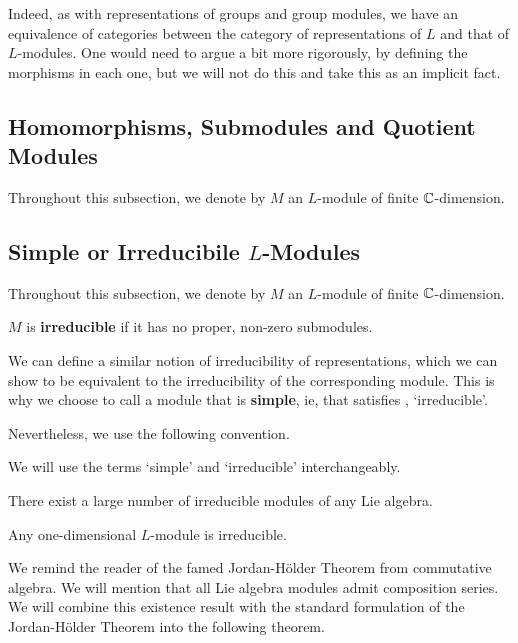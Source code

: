 Indeed, as with representations of groups and group modules, we have an equivalence of categories between the category of representations of $L$ and that of $L$-modules. One would need to argue a bit more rigorously, by defining the morphisms in each one, but we will not do this and take this as an implicit fact.

\subsection{Homomorphisms, Submodules and Quotient Modules}

Throughout this subsection, we denote by $M$ an $L$-module of finite $\mathbb{C}$-dimension.

\sorry %

\subsection{Simple or Irreducibile $L$-Modules}

Throughout this subsection, we denote by $M$ an $L$-module of finite $\mathbb{C}$-dimension.

\begin{boxdefinition}[Irreducibility]\label{Ch2:Def:IrreducibleModule}
    $M$ is \textbf{irreducible} if it has no proper, non-zero submodules.
\end{boxdefinition}
\begin{remark}
    We can define a similar notion of irreducibility of representations, which we can show to be equivalent to the irreducibility of the corresponding module. This is why we choose to call a module that is \textbf{simple}, ie, that satisfies , `irreducible'.
\end{remark}
Nevertheless, we use the following convention.
\begin{boxconvention}
    We will use the terms `simple' and `irreducible' interchangeably.
\end{boxconvention}

There exist a large number of irreducible modules of any Lie algebra.

\begin{boxexample}\label{Ch2:Eg:1DModuleIrred}
    Any one-dimensional $L$-module is irreducible.
\end{boxexample}

We remind the reader of the famed Jordan-Hölder Theorem from commutative algebra. We will mention that all Lie algebra modules admit composition series. We will combine this existence result with the standard formulation of the Jordan-Hölder Theorem into the following theorem.

